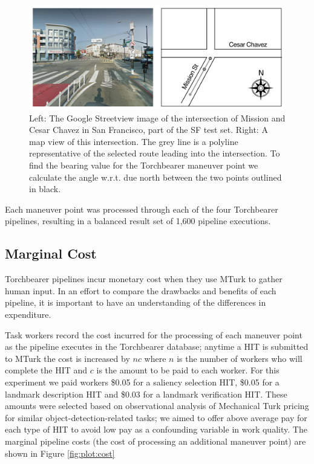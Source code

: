 \begin{figure}[htbp]
  \centering
  \includegraphics[width=\textwidth]{images/POLYLINE.png}
  \caption{Left: The Google Streetview image of the intersection of Mission and Cesar Chavez in San Francisco, part of the SF test set. Right: A map view of this intersection. The grey line is a polyline representative of the selected route leading into the intersection. To find the bearing value for the Torchbearer maneuver point we calculate the angle w.r.t. due north between the two points outlined in black.}
  \label{fig:polyline}
\end{figure}

Each maneuver point was processed through each of the four Torchbearer pipelines, resulting in a balanced result set of 1,600 pipeline executions.

\subsection{Marginal Cost}

Torchbearer pipelines incur monetary cost when they use MTurk to gather human input. In an effort to compare the drawbacks and benefits of each pipeline, it is important to have an understanding of the differences in expenditure.

Task workers record the cost incurred for the processing of each maneuver point as the pipeline executes in the Torchbearer database; anytime a HIT is submitted to MTurk the cost is increased by $nc$ where $n$ is the number of workers who will complete the HIT and $c$ is the amount to be paid to each worker. For this experiment we paid workers \$0.05 for a saliency selection HIT, \$0.05 for a landmark description HIT and \$0.03 for a landmark verification HIT. These amounts were selected based on observational analysis of Mechanical Turk pricing for similar object-detection-related tasks; we aimed to offer above average pay for each type of HIT to avoid low pay as a confounding variable in work quality. The marginal pipeline costs (the cost of processing an additional maneuver point) are shown in Figure \ref{fig:plot:cost}


